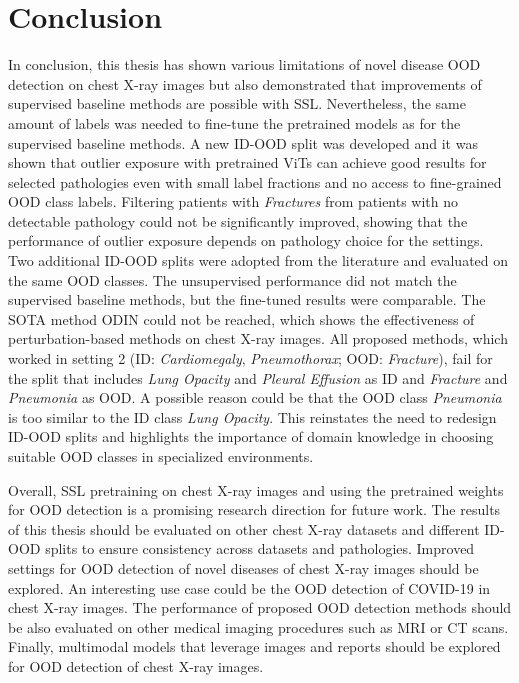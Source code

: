 \section{Conclusion}
In conclusion, this thesis has shown various limitations of novel disease OOD detection on chest X-ray images but also demonstrated that improvements of supervised baseline methods are possible with SSL. 
Nevertheless, the same amount of labels was needed to fine-tune the pretrained models as for the supervised baseline methods.
A new ID-OOD split was developed and it was shown that outlier exposure with pretrained ViTs can achieve good results for selected pathologies even with small label fractions and no access to fine-grained OOD class labels.
Filtering patients with \textit{Fractures} from patients with no detectable pathology could not be significantly improved, showing that the performance of outlier exposure depends on pathology choice for the settings.
Two additional ID-OOD splits were adopted from the literature and evaluated on the same OOD classes.
The unsupervised performance did not match the supervised baseline methods, but the fine-tuned results were comparable.
The SOTA method ODIN could not be reached, which shows the effectiveness of perturbation-based methods on chest X-ray images.
All proposed methods, which worked in setting 2 (ID: \textit{Cardiomegaly}, \textit{Pneumothorax}; OOD: \textit{Fracture}), fail for the split that includes \textit{Lung Opacity} and \textit{Pleural Effusion} as ID and \textit{Fracture} and \textit{Pneumonia} as OOD.
A possible reason could be that the OOD class \textit{Pneumonia} is too similar to the ID class \textit{Lung Opacity}.
This reinstates the need to redesign ID-OOD splits and highlights the importance of domain knowledge in choosing suitable OOD classes in specialized environments.
\par 
Overall, SSL pretraining on chest X-ray images and using the pretrained weights for OOD detection is a promising research direction for future work.
The results of this thesis should be evaluated on other chest X-ray datasets and different ID-OOD splits to ensure consistency across datasets and pathologies.
Improved settings for OOD detection of novel diseases of chest X-ray images should be explored.
An interesting use case could be the OOD detection of COVID-19 in chest X-ray images.
The performance of proposed OOD detection methods should be also evaluated on other medical imaging procedures such as MRI or CT scans.
Finally, multimodal models that leverage images and reports should be explored for OOD detection of chest X-ray images.
